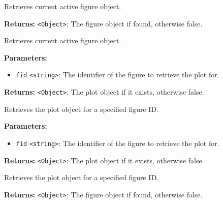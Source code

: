 \documentclass[12pt,a4paper]{article}
\begin{document}
\noindent Retrieves current active figure object.

\vspace{5mm}
\noindent {}


\noindent \textbf{Returns:} \texttt{<Object>}: The figure object if found, otherwise \textasciigrave{}false\textasciigrave{}.

\noindent Retrieves current active figure object.

\vspace{5mm}
\noindent {}


\noindent \textbf{Parameters:}
\begin{itemize}
  \item \texttt{fid} \texttt{<string>}: The identifier of the figure to retrieve the plot for.
\end{itemize}

\noindent \textbf{Returns:} \texttt{<Object>}: The plot object if it exists, otherwise \textasciigrave{}false\textasciigrave{}.

\noindent Retrieves the plot object for a specified figure ID.

\vspace{5mm}
\noindent {}


\noindent \textbf{Parameters:}
\begin{itemize}
  \item \texttt{fid} \texttt{<string>}: The identifier of the figure to retrieve the plot for.
\end{itemize}

\noindent \textbf{Returns:} \texttt{<Object>}: The plot object if it exists, otherwise \textasciigrave{}false\textasciigrave{}.

\noindent Retrieves the plot object for a specified figure ID.

\vspace{5mm}
\noindent {}


\noindent \textbf{Returns:} \texttt{<Object>}: The figure object if found, otherwise \textasciigrave{}false\textasciigrave{}.
\end{document}
